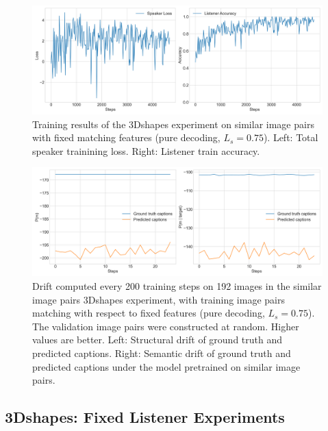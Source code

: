 \begin{figure}
	\centering
	\includegraphics[width=\linewidth]{images/3dshapes_baseline_similarFixed_075_losses.png}
	\caption{Training results of the 3Dshapes experiment on similar image pairs with fixed matching features (pure decoding, $L_s = 0.75$). Left: Total speaker trainining loss. Right: Listener train accuracy.}
	\label{fig:3dshapes_similarFixed_075_speaker_loss_listener_acc}
\end{figure}

\begin{figure}
	\centering
	\includegraphics[width=\linewidth]{images/3dshapes_baseline_structural_semantic_drift_49_pure_075_similarFixed.png}
	\caption{Drift computed every 200 training steps on 192 images in the similar image pairs 3Dshapes experiment, with training image pairs matching with respect to fixed features (pure decoding, $L_s = 0.75$). The validation image pairs were constructed at random. Higher values are better. Left: Structural drift of ground truth and predicted captions. Right: Semantic drift of ground truth and predicted captions under the model pretrained on similar image pairs.} 
	\label{fig:3dshapes_similarFixed_075_str_sem_drift}
\end{figure}


\subsection{3Dshapes: Fixed Listener Experiments}

